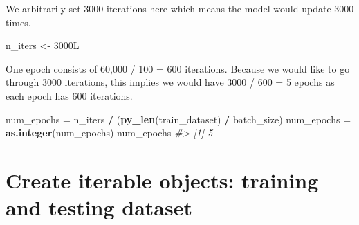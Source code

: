 \documentclass[]{book}
\newenvironment{Shaded}{\begin{snugshade}}{\end{snugshade}}
\newcommand{\CommentTok}[1]{\textcolor[rgb]{0.56,0.35,0.01}{\textit{#1}}}
\newcommand{\DataTypeTok}[1]{\textcolor[rgb]{0.13,0.29,0.53}{#1}}
\newcommand{\KeywordTok}[1]{\textcolor[rgb]{0.13,0.29,0.53}{\textbf{#1}}}
\newcommand{\NormalTok}[1]{#1}
\newcommand{\OperatorTok}[1]{\textcolor[rgb]{0.81,0.36,0.00}{\textbf{#1}}}
\newcommand{\OtherTok}[1]{\textcolor[rgb]{0.56,0.35,0.01}{#1}}
\newcommand{\StringTok}[1]{\textcolor[rgb]{0.31,0.60,0.02}{#1}}
\begin{document}
We arbitrarily set 3000 iterations here which means the model would update 3000 times.

\begin{Shaded}
\begin{Highlighting}[]
\NormalTok{n_iters <-}\StringTok{ }\NormalTok{3000L}
\end{Highlighting}
\end{Shaded}

One epoch consists of 60,000 / 100 = 600 iterations. Because we would like to go through 3000 iterations, this implies we would have 3000 / 600 = 5 epochs as each epoch has 600 iterations.

\begin{Shaded}
\begin{Highlighting}[]
\NormalTok{num_epochs =}\StringTok{ }\NormalTok{n_iters }\OperatorTok{/}\StringTok{ }\NormalTok{(}\KeywordTok{py_len}\NormalTok{(train_dataset) }\OperatorTok{/}\StringTok{ }\NormalTok{batch_size)}
\NormalTok{num_epochs =}\StringTok{ }\KeywordTok{as.integer}\NormalTok{(num_epochs)}
\NormalTok{num_epochs}
\CommentTok{#> [1] 5}
\end{Highlighting}
\end{Shaded}

\hypertarget{create-iterable-objects-training-and-testing-dataset}{%
\section{Create iterable objects: training and testing dataset}\label{create-iterable-objects-training-and-testing-dataset}}

\begin{Shaded}
\end{Shaded}

\begin{Shaded}
\end{Shaded}
\end{document}
